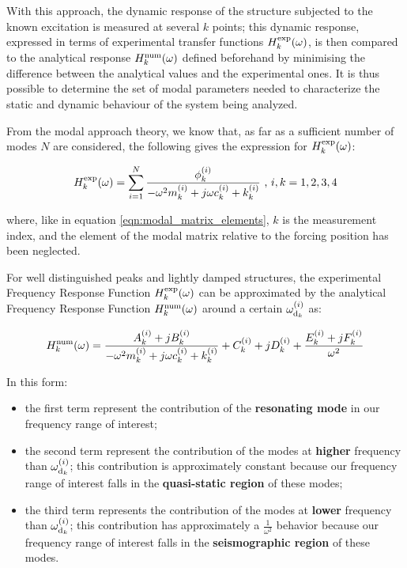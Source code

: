 \documentclass[a4paper,12pt,oneside]{article}
\begin{document}
With this approach, the dynamic response of the structure subjected to the known excitation is measured at several $ k $ points; this dynamic response, expressed in terms of experimental transfer functions $ H^\textup{exp}_k(\omega) $, is then compared to the analytical response $ H^\textup{num}_k(\omega) $ defined beforehand by minimising the difference between the analytical values and the experimental ones. It is thus possible to determine the set of modal parameters needed to characterize the static and dynamic behaviour of the system being analyzed.

From the modal approach theory, we know that, as far as a sufficient number of modes $ N $ are considered, the following gives the expression for $ H^\textup{exp}_k(\omega) $:

\begin{equation}
\label{eqn:h_exp_modal} 
	H^\textup{exp}_k(\omega) = \sum_{i=1}^{N} \frac{\phi_k^{(i)}}
		{-\omega^2 m^{(i)}_k + j \omega c^{(i)}_k + k^{(i)}_k}
		~ \text{,} ~ i,k = 1,2,3,4
\end{equation}

where, like in equation \eqref{eqn:modal_matrix_elements}, $ k $ is the measurement index, and the element of the modal matrix relative to the forcing position has been neglected.

For well distinguished peaks and lightly damped structures, the experimental Frequency Response Function $ H^\textup{exp}_k(\omega) $ can be approximated by the analytical Frequency Response Function $ H^\textup{num}_k(\omega) $ around a certain $ \omega_{\textup{d}_k}^{(i)} $ as:

\[	
	H^\textup{num}_k(\omega) = \frac{A^{(i)}_k + j B^{(i)}_k}
		{-\omega^2 m^{(i)}_k + j \omega c^{(i)}_k + k^{(i)}_k}
		+ C^{(i)}_k + j D^{(i)}_k
		+ \frac{E^{(i)}_k + j F^{(i)}_k}{\omega^2}
\]

In this form:

\begin{itemize}
	\item the first term represent the contribution of the \textbf{resonating mode} in our frequency range of interest;
	\item the second term represent the contribution of the modes at \textbf{higher} frequency than $ \omega_{\textup{d}_k}^{(i)} $; this contribution is approximately constant because our frequency range of interest falls in the \textbf{quasi-static region} of these modes;
	\item the third term represents the contribution of the modes at \textbf{lower} frequency than $ \omega_{\textup{d}_k}^{(i)} $; this contribution has approximately a $ \frac{1}{\omega^2} $ behavior because our frequency range of interest falls in the \textbf{seismographic region} of these modes.
\end{itemize}
\end{document}
